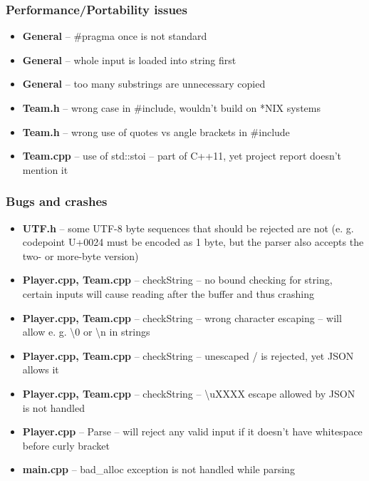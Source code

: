 \documentclass{beamer}
\begin{document}

\begin{frame}
\frametitle{Performance/Portability issues}

\begin{itemize}
\item \textbf{General} -- \#pragma once is not standard
\item \textbf{General} -- whole input is loaded into string first
\item \textbf{General} -- too many substrings are unnecessary copied
\item \textbf{Team.h} -- wrong case in \#include, wouldn't build on *NIX systems
\item \textbf{Team.h} -- wrong use of quotes vs angle brackets in \#include
\item \textbf{Team.cpp} -- use of std::stoi -- part of C++11, yet project report doesn't mention it
\end{itemize}

\end{frame}


\begin{frame}
\frametitle{Bugs and crashes}

\begin{itemize}
\item \textbf{UTF.h} -- some UTF-8 byte sequences that should be rejected are not (e. g. codepoint U+0024 must be encoded as 1 byte, but the parser also accepts the two- or more-byte version)
\item \textbf{Player.cpp, Team.cpp} -- checkString -- no bound checking for string, certain inputs will cause reading after the buffer and thus crashing
\item \textbf{Player.cpp, Team.cpp} -- checkString -- wrong character escaping -- will allow e. g. \textbackslash 0 or \textbackslash n in strings
\item \textbf{Player.cpp, Team.cpp} -- checkString -- unescaped / is rejected, yet JSON allows it
\item \textbf{Player.cpp, Team.cpp} -- checkString -- \textbackslash uXXXX escape allowed by JSON is not handled
\item \textbf{Player.cpp} -- Parse -- will reject any valid input if it doesn't have whitespace before curly bracket
\item \textbf{main.cpp} -- bad\_alloc exception is not handled while parsing
\end{itemize}

\end{frame}
\end{document}
